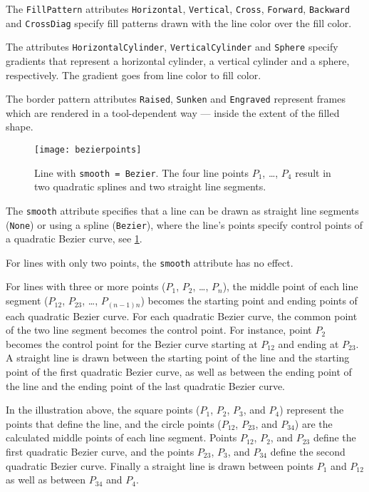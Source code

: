 The \lstinline!FillPattern! attributes \lstinline!Horizontal!, \lstinline!Vertical!, \lstinline!Cross!, \lstinline!Forward!, \lstinline!Backward! and \lstinline!CrossDiag! specify fill patterns drawn with the line color over the fill color.

The attributes \lstinline!HorizontalCylinder!, \lstinline!VerticalCylinder! and \lstinline!Sphere! specify
gradients that represent a horizontal cylinder, a vertical cylinder and
a sphere, respectively. The gradient goes from line color to fill color.

The border pattern attributes \lstinline!Raised!, \lstinline!Sunken! and \lstinline!Engraved! represent frames which are rendered in a tool-dependent way --- inside the extent of the filled shape.

\begin{figure}[H]
  \begin{center}
    \texttt{[image: bezierpoints]}
  \end{center}
  \caption{Line with \lstinline!smooth = Bezier!.  The four line points $P_{1}$, \ldots{}, $P_{4}$ result in two quadratic splines and two straight line segments.}\label{fig:smooth-bezier}
\end{figure}

The \lstinline!smooth! attribute specifies that a line can be drawn as straight line
segments (\lstinline!None!) or using a spline (\lstinline!Bezier!), where the line's points
specify control points of a quadratic Bezier curve, see \cref{fig:smooth-bezier}.

For lines with only two points, the \lstinline!smooth! attribute has no effect.

For lines with three or more points ($P_{1}$, $P_{2}$, \ldots{}, $P_{n}$), the middle point of each line segment ($P_{12}$, $P_{23}$, \ldots{}, $P_{(n-1)n}$) becomes the starting point and ending
points of each quadratic Bezier curve.  For each quadratic Bezier curve, the common point of the two line segment becomes the control point. For instance, point $P_{2}$ becomes the control point for
the Bezier curve starting at $P_{12}$ and ending at $P_{23}$.  A straight line is drawn between the starting point of the line and the starting point of the first quadratic Bezier curve, as well as
between the ending point of the line and the ending point of the last quadratic Bezier curve.

In the illustration above, the square points ($P_{1}$, $P_{2}$, $P_{3}$, and $P_{4}$) represent the points that define the line, and the circle points ($P_{12}$, $P_{23}$, and $P_{34}$) are the
calculated middle points of each line segment.  Points $P_{12}$, $P_{2}$, and $P_{23}$ define the first quadratic Bezier curve, and the points $P_{23}$, $P_{3}$, and $P_{34}$ define the second
quadratic Bezier curve.  Finally a straight line is drawn between points $P_{1}$ and $P_{12}$ as well as between $P_{34}$ and $P_{4}$.

